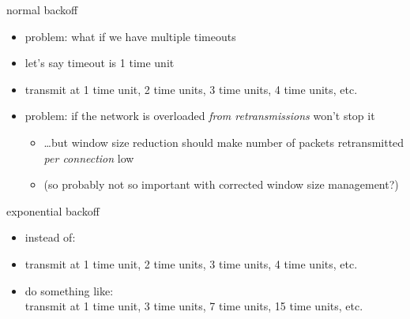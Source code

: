 \begin{frame}{normal backoff}
    \begin{itemize}
    \item problem: what if we have multiple timeouts
    \vspace{.5cm}
    \item let's say timeout is 1 time unit
    \item transmit at 1 time unit, 2 time units, 3 time units, 4 time units, etc.
    \vspace{.5cm}
    \item problem: if the network is overloaded \textit{from retransmissions} won't stop it
        \begin{itemize}
        \item \ldots but window size reduction should make number of packets retransmitted \textit{per connection} low
        \item (so probably not so important with corrected window size management?)
        \end{itemize}
    \end{itemize}
\end{frame}

\begin{frame}{exponential backoff}
    \begin{itemize}
    \item instead of: \\
    \item transmit at 1 time unit, 2 time units, 3 time units, 4 time units, etc.
    \vspace{.5cm}
    \item do something like: \\
    transmit at 1 time unit, 3 time units, 7 time units, 15 time units, etc.
    \end{itemize}
\end{frame}

